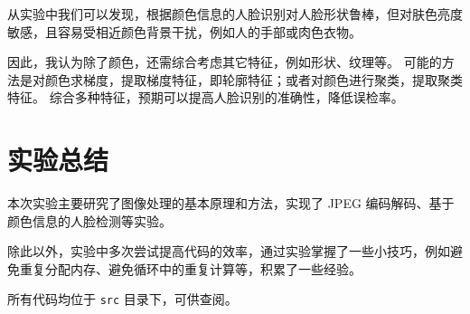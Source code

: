 \documentclass[a4paper]{article}  %
\begin{document}
从实验中我们可以发现，根据颜色信息的人脸识别对人脸形状鲁棒，但对肤色亮度敏感，且容易受相近颜色背景干扰，例如人的手部或肉色衣物。

因此，我认为除了颜色，还需综合考虑其它特征，例如形状、纹理等。
可能的方法是对颜色求梯度，提取梯度特征，即轮廓特征；或者对颜色进行聚类，提取聚类特征。
综合多种特征，预期可以提高人脸识别的准确性，降低误检率。

\section{实验总结}

本次实验主要研究了图像处理的基本原理和方法，实现了 JPEG 编码解码、基于颜色信息的人脸检测等实验。

除此以外，实验中多次尝试提高代码的效率，通过实验掌握了一些小技巧，例如避免重复分配内存、避免循环中的重复计算等，积累了一些经验。

所有代码均位于 \texttt{src} 目录下，可供查阅。
\end{document}
